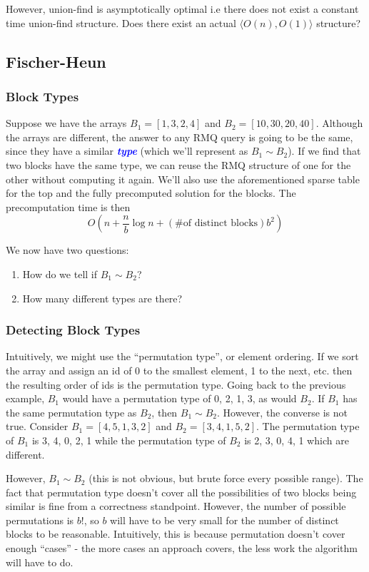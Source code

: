 \documentclass[11pt, oneside]{article}
\newcommand{\emphasis}[1]{\textcolor{blue}{\textbf{\textit{#1}}}}
\begin{document}
However, union-find is asymptotically optimal i.e there does not exist a constant time
union-find structure. Does there exist an actual \( \langle O(n), O(1) \rangle \) structure?

\subsection{Fischer-Heun}

\subsubsection{Block Types}
Suppose we have the arrays \( B_1 = [1, 3, 2, 4] \) and \( B_2 = [10, 30, 20, 40] \).
Although the arrays are different, the answer to any RMQ query is going to be the same,
since they have a similar \emphasis{type} (which we'll represent as \( B_1 \sim B_2 \)).
If we find that two blocks have the same type, we can reuse the RMQ structure of one
for the other without computing it again. We'll also use the aforementioned sparse table
for the top and the fully precomputed solution for the blocks.
The precomputation time is then
\[ O(n + \frac{n}{b} \log n + (\text{\# of distinct blocks}) b^2) \]

We now have two questions:
\begin{enumerate}
  \item How do we tell if \( B_1 \sim B_2 \)?
  \item How many different types are there?
\end{enumerate}

\subsubsection{Detecting Block Types}
Intuitively, we might use the ``permutation type'', or element ordering.
If we sort the array and assign an id of 0 to the smallest element, 1 to the next, etc.
then the resulting order of ids is the permutation type. Going back to the previous example,
\( B_1 \) would have a permutation type of 0, 2, 1, 3, as would \( B_2 \).
If \( B_1 \) has the same permutation type as \( B_2 \), then \( B_1 \sim B_2 \).
However, the converse is not true. Consider \( B_1 = [4, 5, 1, 3, 2] \) and \( B_2 = [3, 4, 1, 5, 2] \).
The permutation type of \( B_1 \) is 3, 4, 0, 2, 1 while the permutation type of \( B_2 \) is 2, 3, 0, 4, 1
which are different.

However, \( B_1 \sim B_2 \) (this is not obvious, but brute force every possible range).
The fact that permutation type doesn't cover all the possibilities of two blocks being similar is fine
from a correctness standpoint. However, the number of possible permutations is \( b! \),
so \( b \) will have to be very small for the number of distinct blocks to be reasonable.
Intuitively, this is because permutation doesn't cover enough ``cases'' - the more cases
an approach covers, the less work the algorithm will have to do.
\end{document}
